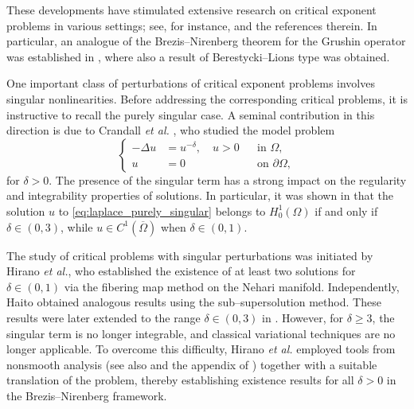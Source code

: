 \documentclass[11pt]{article}
\begin{document}
These developments have stimulated extensive research on critical exponent problems in various settings; see, for instance, \cite{sanjit_bal2024multiplicity, bisci_malachini_secchi_bifurcation_multiplicity, zhang_yang_grushin_hardy, zhang_yang_grushin_hardy_asymptotic} and the references therein. In particular, an analogue of the Brezis--Nirenberg theorem for the Grushin operator was established in \cite{alves_tyagi_brezis-nirenberg}, where also a result of Berestycki--Lions type was obtained.


One important class of perturbations of critical exponent problems involves singular nonlinearities. Before addressing the corresponding critical problems, it is instructive to recall the purely singular case. A seminal contribution in this direction is due to Crandall \textit{et al.} \cite{crandaal}, who studied the model problem
\begin{equation}\label{eq:laplace_purely_singular}
   \left\{
	\begin{aligned}
		-\Delta u &= u^{-\delta}, \quad u>0 && \text{in } \Omega,\\
		u &= 0 && \text{on } \partial\Omega,
	\end{aligned}
    \right.
\end{equation}
for $\delta > 0$. The presence of the singular term has a strong impact on the regularity and integrability properties of solutions. In particular, it was shown in \cite{mckenna_integrability_singular} that the solution $u$ to \eqref{eq:laplace_purely_singular} belongs to $H_0^1(\Omega)$ if and only if $\delta \in (0,3)$, while $u \in C^1(\overline{\Omega})$ when $\delta \in (0,1)$. 

The study of critical problems with singular perturbations was initiated by Hirano \textit{et al.}, who established the existence of at least two solutions for $\delta \in (0,1)$ via the fibering map method on the Nehari manifold. Independently, Haito \cite{Haito} obtained analogous results using the sub--supersolution method. These results were later extended to the range $\delta \in (0,3)$ in \cite{adimurthi_giacomoni_strong_singular}. However, for $\delta \geq 3$, the singular term is no longer integrable, and classical variational techniques are no longer applicable. To overcome this difficulty, Hirano \textit{et al.} \cite{hirano_fully_singular} employed tools from nonsmooth analysis (see also \cite{corvellec_nonsmooth_analysis, jabri_nonsmooth_book} and the appendix of \cite{hirano_fully_singular}) together with a suitable translation of the problem, thereby establishing existence results for all $\delta > 0$ in the Brezis--Nirenberg framework.
\end{document}
